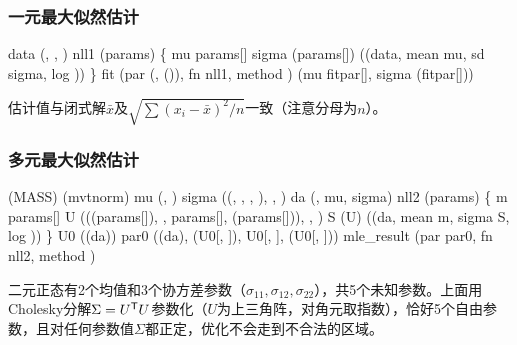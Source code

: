 \subsubsection{一元最大似然估计}
\begin{code}
data \ROperator{<-} (, , )
nll1 \ROperator{<-} (params) \{
  mu \ROperator{<-} params[]
  sigma \ROperator{<-} (params[])          
  \ROperator{-}((data, mean \ROperator{=} mu, sd \ROperator{=} sigma, log \ROperator{=} ))
\}
fit \ROperator{<-} (par \ROperator{=} (, ()), fn \ROperator{=} nll1, method \ROperator{=} )
(mu \ROperator{=} fit\ROperator{\$}par[], sigma \ROperator{=} (fit\ROperator{\$}par[]))
\end{code}
估计值与闭式解$\bar x$及$\sqrt{\sum(x_i-\bar x)^2/n}$一致（注意分母为$n$）。
\subsubsection{多元最大似然估计}
\begin{code}
(MASS)                      
(mvtnorm)                   
mu \ROperator{<-} (, )
sigma \ROperator{<-} ((, , , ), , )
da \ROperator{<-} (, mu, sigma)
nll2 \ROperator{<-} (params) \{
  m \ROperator{<-} params[\ROperator{:}]                       
  U \ROperator{<-} (((params[]), , params[], (params[])), , )
  S \ROperator{<-} (U)                     
  \ROperator{-}((da, mean \ROperator{=} m, sigma \ROperator{=} S, log \ROperator{=} ))
\}
U0 \ROperator{<-} ((da))                      
par0 \ROperator{<-} ((da), (U0[, ]), U0[, ], (U0[, ]))
mle\_result \ROperator{<-} (par \ROperator{=} par0, fn \ROperator{=} nll2, method \ROperator{=} )
\end{code}
二元正态有2个均值和3个协方差参数（$\sigma_{11},\sigma_{12},\sigma_{22}$），共5个未知参数。上面用Cholesky分解$\Sigma=U^{\mathsf T} U$参数化（$U$为上三角阵，对角元取指数），恰好5个自由参数，且对任何参数值$\Sigma$都正定，优化不会走到不合法的区域。


